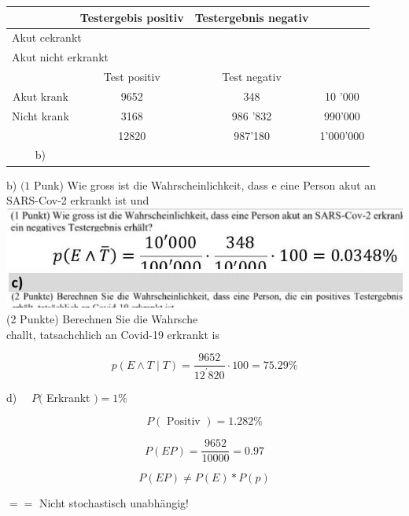 \documentclass[10pt]{article}
\begin{document}
{\begin{center}
\begin{tabular}{|c|c|c|c|}
\hline
 & Testergebis positiv & Testergebnis negativ &  \\
\hline
\multicolumn{4}{|l|}{Akut cekrankt} \\
\hline
\multicolumn{4}{|l|}{\multirow[t]{2}{*}{Akut nicht erkrankt}} \\
\hline
 &  &  &  \\
\hline
 & Test positiv & Test negativ &  \\
\hline
Akut krank & 9652 & 348 & 10 '000 \\
\hline
Nicht krank & 3168 & 986 '832 & 990'000 \\
\hline
 & 12820 & 987'180 & 1'000'000 \\
\hline
b) &  &  &  \\
\hline
\end{tabular}
\end{center}

b) $(1$ Punk) Wie gross ist die Wahrscheinlichkeit, dass e eine Person akut an SARS-Cov-2 erkrankt ist und\\
\includegraphics[width=\linewidth]{images/2024_12_29_0906b02acf849bda8665g-4(2)}\\
\includegraphics[width=\linewidth]{images/2024_12_29_0906b02acf849bda8665g-4(9)} (2 Punkte) Berechnen Sie die Wahrsche\\
challt, tatsachchlich an Covid-19 erkrankt is

$$
p(E \wedge T \mid T)=\frac{9652}{12^{\prime} 820} \cdot 100=75.29 \%
$$

d) $\quad P($ Erkrankt $)=1 \%$

$$
P(\text { Positiv })=1.282 \%
$$

$$
P(E P)=\frac{9652}{10000}=0.97
$$

$$
P(E P) \neq P(E) * P(p)
$$

$==$ Nicht stochastisch unabhängig!

}
\end{document}
